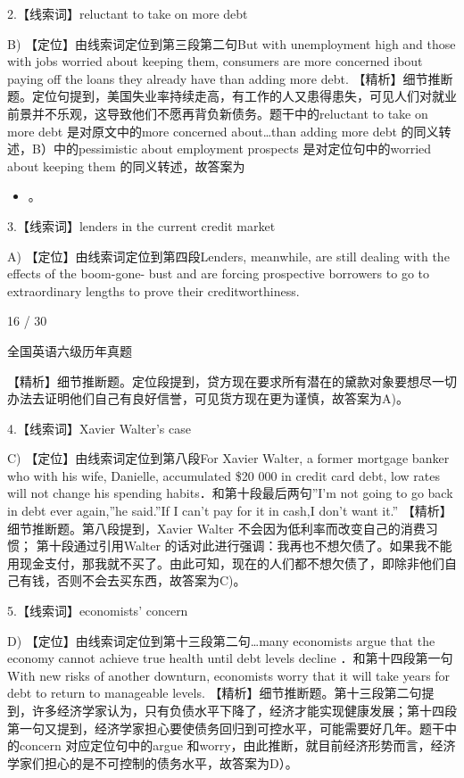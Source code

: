 \documentclass[UTF8,11pt]{ctexart}
\begin{document}
2.【线索词】reluctant to take on more debt


B) 【定位】由线索词定位到第三段第二句But with unemployment high and those with jobs worried about keeping them, consumers are more concerned ibout paying off the loans they already have than adding more debt. 【精析】细节推断题。定位句提到，美国失业率持续走高，有工作的人又患得患失，可见人们对就业前景并不乐观，这导致他们不愿再背负新债务。题干中的reluctant to take on more debt 是对原文中的more concerned about…than adding more debt 的同义转述，B）中的pessimistic about employment prospects 是对定位句中的worried about keeping them 的同义转述，故答案为


\begin{itemize}[leftmargin=2em,itemsep=.2em,topsep=.4em]\item[B.] 。
\end{itemize}

3.【线索词】lenders in the current credit market


A) 【定位】由线索词定位到第四段Lenders, meanwhile, are still dealing with the effects of the boom-gone- bust and are forcing prospective borrowers to go to extraordinary lengths to prove their creditworthiness.


16 / 30


全国英语六级历年真题


【精析】细节推断题。定位段提到，贷方现在要求所有潜在的黛款对象要想尽一切办法去证明他们自己有良好信誉，可见货方现在更为谨慎，故答案为A)。


4.【线索词】Xavier Walter's case


C) 【定位】由线索词定位到第八段For Xavier Walter, a former mortgage banker who with his wife, Danielle, accumulated \$20 000 in credit card debt, low rates will not change his spending habits．和第十段最后两句”I'm not going to go back in debt ever again,”he said.”If I can't pay for it in cash,I don't want it.” 【精析】细节推断题。第八段提到，Xavier Walter 不会因为低利率而改变自己的消费习惯； 第十段通过引用Walter 的话对此进行强调：我再也不想欠债了。如果我不能用现金支付，那我就不买了。由此可知，现在的人们都不想欠债了，即除非他们自己有钱，否则不会去买东西，故答案为C)。


5.【线索词】economists' concern


D) 【定位】由线索词定位到第十三段第二句…many economists argue that the economy cannot achieve true health until debt levels decline ．和第十四段第一句With new risks of another downturn, economists worry that it will take years for debt to return to manageable levels. 【精析】细节推断题。第十三段第二句提到，许多经济学家认为，只有负债水平下降了，经济才能实现健康发展；第十四段第一句又提到，经济学家担心要使债务回归到可控水平，可能需要好几年。题干中的concern 对应定位句中的argue 和worry，由此推断，就目前经济形势而言，经济学家们担心的是不可控制的债务水平，故答案为D）。
\end{document}
